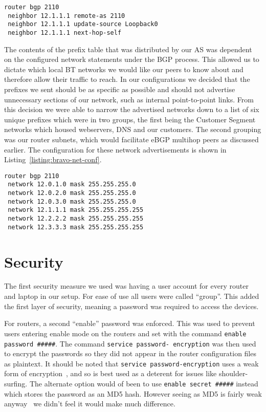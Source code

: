 \begin{lstlisting}[caption={Bravo-Alpha iBGP Configuration}, label={listing:bravo-ibgp-conf}]
router bgp 2110
 neighbor 12.1.1.1 remote-as 2110
 neighbor 12.1.1.1 update-source Loopback0
 neighbor 12.1.1.1 next-hop-self
\end{lstlisting}

The contents of the prefix table that was distributed by our AS was dependent
on the configured network statements under the BGP process. This allowed us to
dictate which local BT networks we would like our peers to know about and
therefore allow their traffic to reach. In our configurations we decided that
the prefixes we sent should be as specific as possible and should not advertise
unnecessary sections of our network, such as internal point-to-point links.
From this decision we were able to narrow the advertised networks down to a
list of six unique prefixes which were in two groups, the first being the
Customer Segment networks which housed webservers, DNS and our customers. The
second grouping was our router subnets, which would facilitate eBGP multihop
peers as discussed earlier. The configuration for these network advertisements
is shown in Listing~\ref{listing:bravo-net-conf}.

\begin{lstlisting}[caption={Bravo BGP Network Configuration}, label={listing:bravo-net-conf}]
router bgp 2110
 network 12.0.1.0 mask 255.255.255.0
 network 12.0.2.0 mask 255.255.255.0
 network 12.0.3.0 mask 255.255.255.0
 network 12.1.1.1 mask 255.255.255.255
 network 12.2.2.2 mask 255.255.255.255
 network 12.3.3.3 mask 255.255.255.255
\end{lstlisting}

\section{Security}
The first security measure we used was having a user account for every router
and laptop in our setup. For ease of use all users were called ``group''. This
added the first layer of security, meaning a password was required to access
the devices.

For routers, a second ``enable'' password was enforced. This was used to
prevent users entering enable mode on the routers and set with the command
\texttt{enable password \#\#\#\#\#}. The command \texttt{service password-
encryption} was then used to encrypt the passwords so they did not appear in
the router configuration files as plaintext. It should be noted that
\texttt{service password-encryption} uses a weak form of
encryption~\cite{ciscocracker}, and so is best used as a deterent for issues
like shoulder-surfing. The alternate option would of been to use
\texttt{enable secret \#\#\#\#\#} instead which stores the password as an MD5
hash. However seeing as MD5 is fairly weak anyway~\cite{md5} we didn't feel it
would make much difference.

